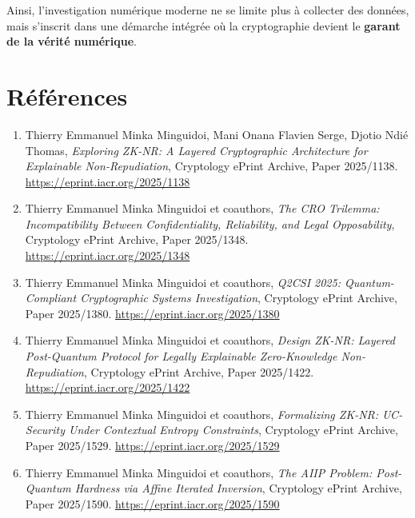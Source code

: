 \documentclass[11pt]{article}
\begin{document}
Ainsi, l’investigation numérique moderne ne se limite plus à collecter des données, mais s’inscrit dans une démarche intégrée où la cryptographie devient le \textbf{garant de la vérité numérique}.
 \newpage
 
\section*{Références}
\begin{enumerate}
    \item Thierry Emmanuel Minka Minguidoi, Mani Onana Flavien Serge, Djotio Ndié Thomas, \textit{Exploring ZK-NR: A Layered Cryptographic Architecture for Explainable Non-Repudiation}, Cryptology ePrint Archive, Paper 2025/1138. \href{https://eprint.iacr.org/2025/1138}{https://eprint.iacr.org/2025/1138}

    \item Thierry Emmanuel Minka Minguidoi et coauthors, \textit{The CRO Trilemma: Incompatibility Between Confidentiality, Reliability, and Legal Opposability}, Cryptology ePrint Archive, Paper 2025/1348. \href{https://eprint.iacr.org/2025/1348}{https://eprint.iacr.org/2025/1348}

    \item Thierry Emmanuel Minka Minguidoi et coauthors, \textit{Q2CSI 2025: Quantum-Compliant Cryptographic Systems Investigation}, Cryptology ePrint Archive, Paper 2025/1380. \href{https://eprint.iacr.org/2025/1380}{https://eprint.iacr.org/2025/1380}

    \item Thierry Emmanuel Minka Minguidoi et coauthors, \textit{Design ZK-NR: Layered Post-Quantum Protocol for Legally Explainable Zero-Knowledge Non-Repudiation}, Cryptology ePrint Archive, Paper 2025/1422. \href{https://eprint.iacr.org/2025/1422}{https://eprint.iacr.org/2025/1422}

    \item Thierry Emmanuel Minka Minguidoi et coauthors, \textit{Formalizing ZK-NR: UC-Security Under Contextual Entropy Constraints}, Cryptology ePrint Archive, Paper 2025/1529. \href{https://eprint.iacr.org/2025/1529}{https://eprint.iacr.org/2025/1529}

    \item Thierry Emmanuel Minka Minguidoi et coauthors, \textit{The AIIP Problem: Post-Quantum Hardness via Affine Iterated Inversion}, Cryptology ePrint Archive, Paper 2025/1590. \href{https://eprint.iacr.org/2025/1590}{https://eprint.iacr.org/2025/1590}


\end{enumerate}
\end{document}
